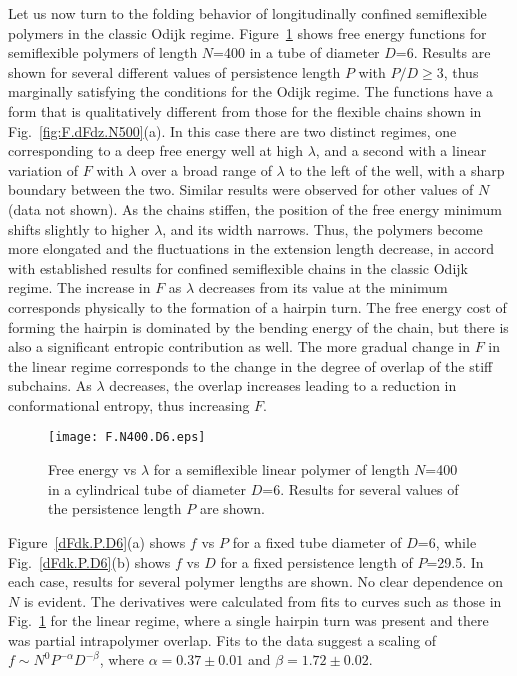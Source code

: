 \documentclass[journal=mamobx,manuscript=article,layout=twocolumn]{achemso}
\begin{document}
Let us now turn to the folding behavior of longitudinally confined semiflexible polymers 
in the classic Odijk regime. Figure~\ref{F.N400.D6} shows free energy functions for 
semiflexible polymers of length $N$=400 in a tube of diameter $D$=6. Results are shown 
for several different values of persistence length $P$ with $P/D \geq 3$, thus marginally 
satisfying the conditions for the Odijk regime. The functions have a form that
is qualitatively different from those for the flexible chains shown in 
Fig.~\ref{fig:F.dFdz.N500}(a). In this case there are two distinct regimes, one
corresponding to a deep free energy well at high $\lambda$, and a second with a
linear variation of $F$ with $\lambda$ over a broad range of $\lambda$ to the
left of the well, with a sharp boundary between the two. Similar results were
observed for other values of $N$ (data not shown). As the chains stiffen, the position 
of the free energy minimum shifts slightly to higher $\lambda$, and its width narrows. 
Thus, the polymers become more elongated and the fluctuations in the extension length
decrease, in accord with established results for confined semiflexible chains in the
classic Odijk regime.\cite{odijk1983statistics} 
The increase in $F$ as $\lambda$ decreases from its value at the minimum
corresponds physically to the formation of a hairpin turn. The free energy cost of
forming the hairpin is dominated by the bending energy of the chain, but there is 
also a significant entropic contribution as well.\cite{odijk2006dna,chen2017conformational} 
The more gradual change in $F$ in the linear regime corresponds to the change in the degree
of overlap of the stiff subchains. As $\lambda$ decreases, the overlap increases
leading to a reduction in conformational entropy, thus increasing $F$.

\begin{figure}[!ht]
\begin{center}
\texttt{[image: F.N400.D6.eps]}
\end{center}
\caption{
Free energy vs $\lambda$ for a semiflexible linear polymer of length $N$=400
in a cylindrical tube of diameter $D$=6. Results for several values of the persistence 
length $P$ are shown. }
\label{F.N400.D6}
\end{figure}

Figure~\ref{dFdk.P.D6}(a) shows $f$ vs $P$ for a fixed tube diameter of $D$=6, while 
Fig.~\ref{dFdk.P.D6}(b) shows $f$ vs $D$ for a fixed persistence length of $P$=29.5. In 
each case, results for several polymer lengths are shown. No clear dependence on
$N$ is evident. The derivatives were calculated
from fits to curves such as those in Fig.~\ref{F.N400.D6} for the linear regime, where
a single hairpin turn was present and there was partial intrapolymer overlap. Fits
to the data suggest a scaling of $f \sim N^0 P^{-\alpha} D^{-\beta}$, where
$\alpha=0.37\pm 0.01$ and $\beta=1.72\pm 0.02$.
\end{document}
